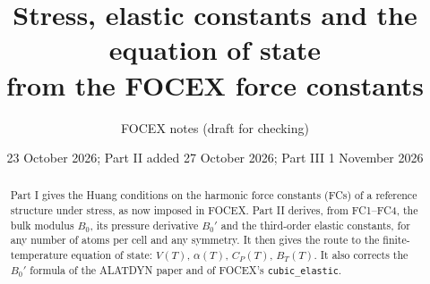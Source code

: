 \documentclass[11pt,a4paper]{article}
\title{Stress, elastic constants and the equation of state\\ from the FOCEX force constants}
\author{FOCEX notes (draft for checking)}
\date{23 October 2026; Part II added 27 October 2026; Part III 1 November 2026}
\begin{document}
\maketitle

\begin{abstract}
Part I gives the Huang conditions on the harmonic force constants (FCs) of a reference structure
under stress, as now imposed in FOCEX. Part II derives, from FC1--FC4, the bulk modulus $B_0$, its
pressure derivative $B_0'$ and the third-order elastic constants, for any number of atoms per cell and
any symmetry. It then gives the route to the finite-temperature equation of state: $V(T)$, $\alpha(T)$,
$C_P(T)$, $B_T(T)$. It also corrects the $B_0'$ formula of the ALATDYN paper and of FOCEX's
\texttt{cubic\_elastic}.
\end{abstract}
\end{document}
